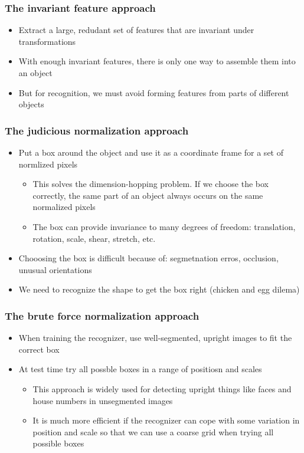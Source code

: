 \subsubsection{The invariant feature approach}
\begin{itemize}[--]
	\item Extract a large, redudant set of features that are invariant under transformations
	\item With enough invariant features, there is only one way to assemble them into an object
	\item But for recognition, we must avoid forming features from parts of different objects
\end{itemize}

\subsubsection{The judicious normalization approach}
\begin{itemize}[--]
	\item Put a box around the object and use it as a coordinate frame for a set of normlized pixels
	\begin{itemize}[--]
		\item This solves the dimension-hopping problem. If we choose the box correctly, the same part of an object always occurs on the same normalized pixels
		\item The box can provide invariance to many degrees of freedom: translation, rotation, scale, shear, stretch, etc.
	\end{itemize}
	\item Chooosing the box is difficult because of: segmetnation erros, occlusion, unusual orientations
	\item We need to recognize the shape to get the box right (chicken and egg dilema)
\end{itemize}

\subsubsection{The brute force normalization approach}
\begin{itemize}[--]
	\item When training the recognizer, use well-segmented, upright images to fit the correct box
	\item At test time try all possble boxes in a range of positiosn and scales
	\begin{itemize}[--]
		\item This approach is widely used for detecting upright things like faces and house numbers in unsegmented images
		\item It is much more efficient if the recognizer can cope with some variation in position and scale so that we can use a coarse grid when trying all possible boxes
	\end{itemize}
\end{itemize}
